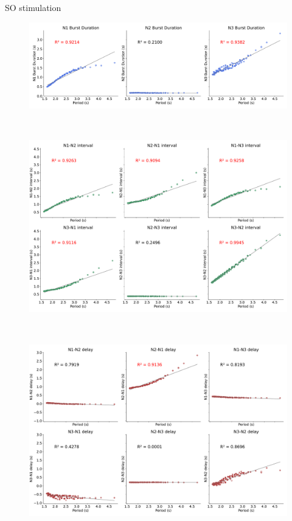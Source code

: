 \documentclass[aspectratio=43]{beamer}
\begin{document}
\begin{frame}{SO stimulation}
\begin{figure}[hbt!]
\begin{minipage}[b]{0.44\textwidth}
					\begin{minipage}[b]{\textwidth}
						\centering
						\includegraphics[width=\textwidth]{invariants/data/MODEL/so_driven/images/3phases/_durations.pdf}
					\end{minipage}\
					\begin{minipage}[b]{\textwidth}
						\centering
						\includegraphics[width=\textwidth]{invariants/data/MODEL/so_driven/images/3phases/_intervals.pdf}
					\end{minipage}\
					\begin{minipage}[b]{\textwidth}
						\centering
						\includegraphics[width=\textwidth]{invariants/data/MODEL/so_driven/images/3phases/_delays.pdf}

\end{minipage}
\end{minipage}
\end{figure}
\end{frame}
\end{document}
